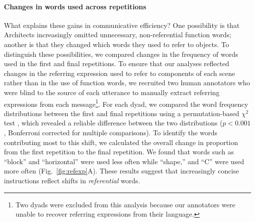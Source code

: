 \documentclass[10pt,letterpaper]{article}
\begin{document}

\paragraph{Changes in words used across repetitions}
What explains these gains in communicative efficiency?
One possibility is that Architects increasingly omitted unnecessary, non-referential function words; another is that they changed which words they used to refer to objects. 
To distinguish these possibilities, we compared changes in the frequency of words used in the first and final repetitions. 
To ensure that our analyses reflected changes in the referring expression used to refer to components of each scene rather than in the use of function words, we recruited two human annotators who were blind to the source of each utterance to manually extract referring expressions from each message\footnote{Two dyads were excluded from this analysis because our annotators were unable to recover referring expressions from their language.}. 
For each dyad, we compared the word frequency distributions between the first and final repetitions using a permutation-based $\chi^2$ test \cite{beh2014correspondence}, which revealed a reliable difference between the two distributions ($p<0.001$, Bonferroni corrected for multiple comparisons).
To identify the words contributing most to this shift, we calculated the overall change in proportion from the first repetition to the final repetition.
We found that words such as ``block'' and ``horizontal'' were used less often while ``shape,'' and ``C'' were used more often (Fig.~\ref{fig:refexp}A).
These results suggest that increasingly concise instructions reflect shifts in \textit{referential} words.

\end{document}
